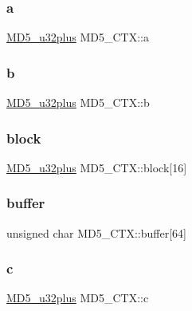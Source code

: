 \subsubsection{\texorpdfstring{a}{a}}
{\footnotesize\ttfamily \hyperlink{md5_8h_ad854d8865ff7e0ce3717676b84926f54}{M\+D5\+\_\+u32plus} M\+D5\+\_\+\+C\+T\+X\+::a}

\hypertarget{structMD5__CTX_a63ef5819a909e0b4065796dfdac25962}{}\label{structMD5__CTX_a63ef5819a909e0b4065796dfdac25962} 
\subsubsection{\texorpdfstring{b}{b}}
{\footnotesize\ttfamily \hyperlink{md5_8h_ad854d8865ff7e0ce3717676b84926f54}{M\+D5\+\_\+u32plus} M\+D5\+\_\+\+C\+T\+X\+::b}

\hypertarget{structMD5__CTX_a2db62677a153981a205d225b051f0609}{}\label{structMD5__CTX_a2db62677a153981a205d225b051f0609} 
\subsubsection{\texorpdfstring{block}{block}}
{\footnotesize\ttfamily \hyperlink{md5_8h_ad854d8865ff7e0ce3717676b84926f54}{M\+D5\+\_\+u32plus} M\+D5\+\_\+\+C\+T\+X\+::block\mbox{[}16\mbox{]}}

\hypertarget{structMD5__CTX_a2da73ecf544745f58211e998719f367f}{}\label{structMD5__CTX_a2da73ecf544745f58211e998719f367f} 
\subsubsection{\texorpdfstring{buffer}{buffer}}
{\footnotesize\ttfamily unsigned char M\+D5\+\_\+\+C\+T\+X\+::buffer\mbox{[}64\mbox{]}}

\hypertarget{structMD5__CTX_a6226440d9b52200d32153df206fe3761}{}\label{structMD5__CTX_a6226440d9b52200d32153df206fe3761} 
\subsubsection{\texorpdfstring{c}{c}}
{\footnotesize\ttfamily \hyperlink{md5_8h_ad854d8865ff7e0ce3717676b84926f54}{M\+D5\+\_\+u32plus} M\+D5\+\_\+\+C\+T\+X\+::c}

